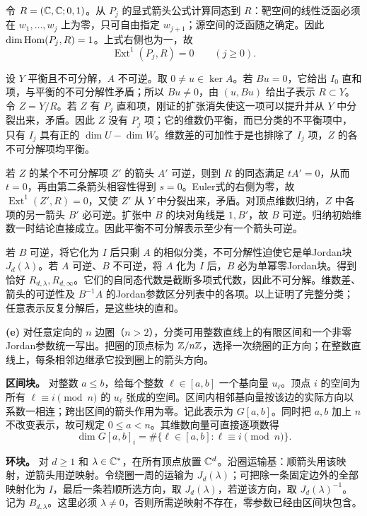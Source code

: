 \begin{solution}
令 $R=(\mathbb C,\mathbb C;0,1)$。从 $P_j$ 的显式箭头公式计算同态到 $R$：靶空间的线性泛函必须在 $w_1,\ldots,w_j$ 上为零，只可自由指定 $w_{j+1}$；源空间的泛函随之确定。因此 $\dim\operatorname{Hom}(P_j,R)=1$。上式右侧也为一，故
\[
 \operatorname{Ext}^1(P_j,R)=0\qquad(j\ge0).
\]

设 $Y$ 平衡且不可分解，$A$ 不可逆。取 $0\ne u\in\ker A$。若 $Bu=0$，它给出 $I_0$ 直和项，与平衡的不可分解性矛盾；所以 $Bu\ne0$，由 $(u,Bu)$ 给出子表示 $R\subset Y$。令 $Z=Y/R$。若 $Z$ 有 $P_j$ 直和项，刚证的扩张消失使这一项可以提升并从 $Y$ 中分裂出来，矛盾。因此 $Z$ 没有 $P_j$ 项；它的维数仍平衡，而已分类的不平衡项中，只有 $I_j$ 具有正的 $\dim U-\dim W$。维数差的可加性于是也排除了 $I_j$ 项，$Z$ 的各不可分解项均平衡。

若 $Z$ 的某个不可分解项 $Z'$ 的箭头 $A'$ 可逆，则到 $R$ 的同态满足 $tA'=0$，从而 $t=0$，再由第二条箭头相容性得到 $s=0$。Euler式的右侧为零，故 $\operatorname{Ext}^1(Z',R)=0$，又使 $Z'$ 从 $Y$ 中分裂出来，矛盾。对顶点维数归纳，$Z$ 中各项的另一箭头 $B'$ 必可逆。扩张中 $B$ 的块对角线是 $1,B'$，故 $B$ 可逆。归纳初始维数一时结论直接成立。因此平衡不可分解表示至少有一个箭头可逆。

若 $B$ 可逆，将它化为 $I$ 后只剩 $A$ 的相似分类，不可分解性迫使它是单Jordan块 $J_d(\lambda)$。若 $A$ 可逆、$B$ 不可逆，将 $A$ 化为 $I$ 后，$B$ 必为单幂零Jordan块。得到恰好 $R_{d,\lambda},R_{d,\infty}$。它们的自同态代数是截断多项式代数，因此不可分解。维数差、箭头的可逆性及 $B^{-1}A$ 的Jordan参数区分列表中的各项。以上证明了完整分类；任意表示反复分解后，是这些块的直和。

\textbf{(e)} 对任意定向的 $n$ 边圈（$n>2$），分类可用整数直线上的有限区间和一个非零Jordan参数统一写出。把圈的顶点标为 $\mathbb Z/n\mathbb Z$，选择一次绕圈的正方向；在整数直线上，每条相邻边继承它投到圈上的箭头方向。

\textbf{区间块。} 对整数 $a\le b$，给每个整数 $\ell\in[a,b]$ 一个基向量 $u_\ell$。顶点 $i$ 的空间为所有 $\ell\equiv i\pmod n$ 的 $u_\ell$ 张成的空间。区间内相邻基向量按该边的实际方向以系数一相连；跨出区间的箭头作用为零。记此表示为 $G[a,b]$。同时把 $a,b$ 加上 $n$ 不改变表示，故可规定 $0\le a<n$。其维数向量可直接逐项数得
\[
 \dim G[a,b]_i=\#\{\ell\in[a,b]:\ell\equiv i\pmod n\}.
\]

\textbf{环块。} 对 $d\ge1$ 和 $\lambda\in\mathbb C^*$，在所有顶点放置 $\mathbb C^d$。沿圈运输基：顺箭头用该映射，逆箭头用逆映射。令绕圈一周的运输为 $J_d(\lambda)$；可把除一条固定边外的全部映射化为 $I$，最后一条若顺所选方向，取 $J_d(\lambda)$，若逆该方向，取 $J_d(\lambda)^{-1}$。记为 $B_{d,\lambda}$。这里必须 $\lambda\ne0$，否则所需逆映射不存在，零参数已经由区间块包含。


\end{solution}
